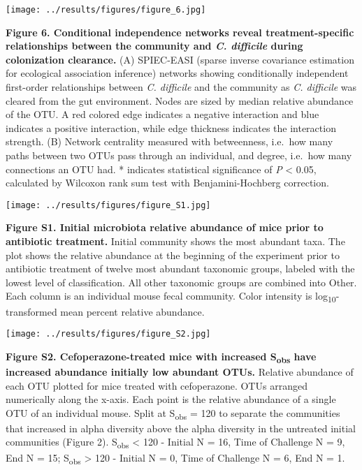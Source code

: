 \documentclass[11pt,]{article}
\begin{document}
\hfill\break

\texttt{[image: ../results/figures/figure\_6.jpg]}

\textbf{Figure 6. Conditional independence networks reveal
treatment-specific relationships between the community and \emph{C.
difficile} during colonization clearance.} (A) SPIEC-EASI (sparse
inverse covariance estimation for ecological association inference)
networks showing conditionally independent first-order relationships
between \emph{C. difficile} and the community as \emph{C. difficile} was
cleared from the gut environment. Nodes are sized by median relative
abundance of the OTU. A red colored edge indicates a negative
interaction and blue indicates a positive interaction, while edge
thickness indicates the interaction strength. (B) Network centrality
measured with betweenness, i.e.~how many paths between two OTUs pass
through an individual, and degree, i.e.~how many connections an OTU had.
* indicates statistical significance of \emph{P} \textless{} 0.05,
calculated by Wilcoxon rank sum test with Benjamini-Hochberg correction.

\hfill\break

\texttt{[image: ../results/figures/figure\_S1.jpg]}

\textbf{Figure S1. Initial microbiota relative abundance of mice prior
to antibiotic treatment.} Initial community shows the most abundant
taxa. The plot shows the relative abundance at the beginning of the
experiment prior to antibiotic treatment of twelve most abundant
taxonomic groups, labeled with the lowest level of classification. All
other taxonomic groups are combined into Other. Each column is an
individual mouse fecal community. Color intensity is
log\textsubscript{10}-transformed mean percent relative abundance.

\hfill\break

\texttt{[image: ../results/figures/figure\_S2.jpg]}

\textbf{Figure S2. Cefoperazone-treated mice with increased
S\textsubscript{obs} have increased abundance initially low abundant
OTUs.} Relative abundance of each OTU plotted for mice treated with
cefoperazone. OTUs arranged numerically along the x-axis. Each point is
the relative abundance of a single OTU of an individual mouse. Split at
S\textsubscript{obs} = 120 to separate the communities that increased in
alpha diversity above the alpha diversity in the untreated initial
communities (Figure 2). S\textsubscript{obs} \textless{} 120 - Initial N
= 16, Time of Challenge N = 9, End N = 15; S\textsubscript{obs}
\textgreater{} 120 - Initial N = 0, Time of Challenge N = 6, End N = 1.
\end{document}
